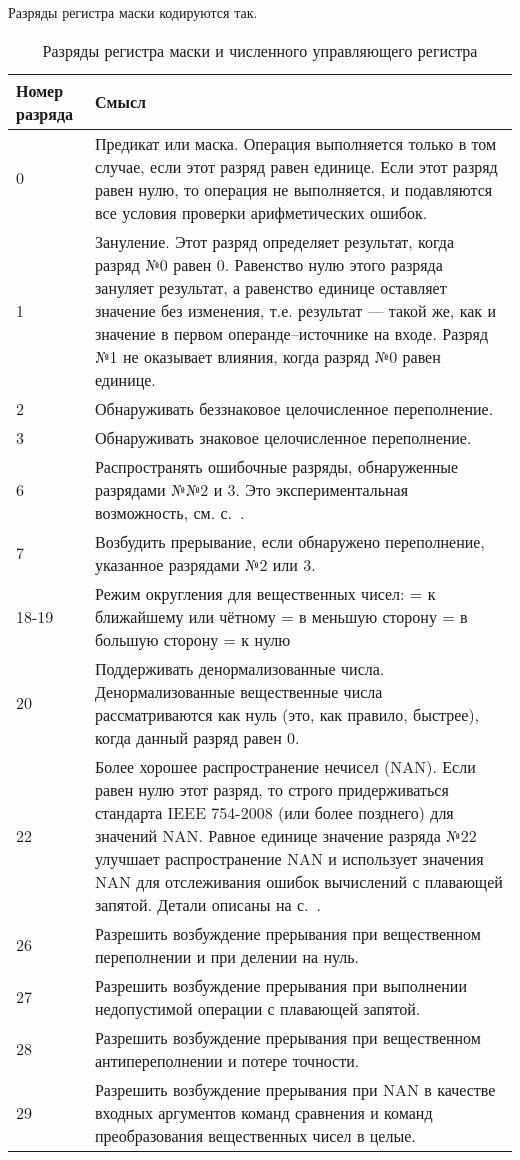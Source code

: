 \documentclass[forwardcom.tex]{subfiles}
\begin{document}
Разряды регистра маски кодируются так.

\newpage

\begin{longtable}{|p{15mm}|p{135mm}|}
\caption{Разряды регистра маски и численного управляющего регистра}
\label{table:maskBits}
\endfirsthead
\endhead
\hline
Номер разряда & Смысл \\
 \hline
0 & Предикат или маска. Операция выполняется только в том случае, если этот разряд равен единице. Если этот разряд равен нулю, то операция не выполняется, и подавляются все условия проверки арифметических ошибок. \\ \hline
1 & Зануление. Этот разряд определяет результат, когда разряд №0 равен 0. Равенство нулю этого разряда зануляет результат, а равенство единице оставляет значение без изменения, т.е. результат --- такой же, как и значение в первом операнде--источнике на входе. Разряд №1 не оказывает влияния, когда разряд №0 равен единице. \\ \hline
2 & Обнаруживать беззнаковое целочисленное переполнение. \\ \hline
3 & Обнаруживать знаковое целочисленное переполнение. \\ \hline
6 & Распространять ошибочные разряды, обнаруженные разрядами №№2 и 3. Это экспериментальная возможность, см. с.~\pageref{integerOverflowDetection}. \\ \hline
7 & Возбудить прерывание, если обнаружено переполнение, указанное разрядами №2 или 3. \\ \hline
18-19 & Режим округления для вещественных чисел: \newline
00 = к ближайшему или чётному \newline
01 = в меньшую сторону \newline
10 = в большую сторону \newline
11 = к нулю \\ \hline
20 & Поддерживать денормализованные числа. Денормализованные вещественные числа рассматриваются как нуль (это, как правило, быстрее), когда данный разряд равен 0. \\ \hline
22 & Более хорошее распространение нечисел (NAN). Если равен нулю этот разряд, то строго придерживаться стандарта IEEE 754-2008 (или более позднего) для значений NAN. Равное единице значение разряда №22 улучшает распространение NAN и использует значения NAN для отслеживания ошибок вычислений с плавающей запятой. Детали описаны на с.~\pageref{nanPropagation}. \\ \hline
26 & Разрешить возбуждение прерывания при вещественном переполнении и при делении на нуль. \\ \hline
27 & Разрешить возбуждение прерывания при выполнении недопустимой операции с плавающей запятой. \\ \hline
28 & Разрешить возбуждение прерывания при вещественном антипереполнении и потере точности. \\ \hline
29 & Разрешить возбуждение прерывания при NAN в качестве входных аргументов команд сравнения и команд преобразования вещественных чисел в целые.  \\ \hline
\end{longtable}
\end{document}
